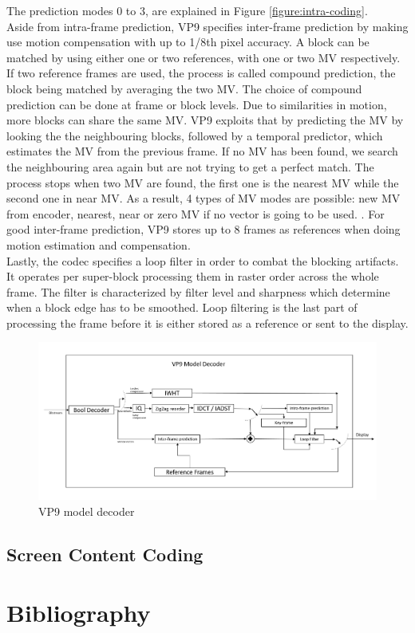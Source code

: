 \documentclass[a4paper,11pt,oneside]{article}
\begin{document}
The prediction modes 0 to 3, are explained in Figure \ref{figure:intra-coding}. \\
Aside from intra-frame prediction, VP9 specifies inter-frame prediction by making use motion compensation with up to 1/8th pixel accuracy. A block can be matched by using either one or two references, with one or two MV respectively. If two reference frames are used, the process is called compound prediction, the block being matched by averaging the two MV. The choice of compound prediction can be done at frame or block levels. Due to similarities in motion, more blocks can share the same MV. VP9 exploits that by predicting the MV by looking the the neighbouring blocks, followed by a temporal predictor, which estimates the MV from the previous frame. If no MV has been found, we search the neighbouring area again but are not trying to get a perfect match. The process stops when two MV are found, the first one is the nearest MV while the second one in near MV. As a result, 4 types of MV modes are possible: new MV from encoder, nearest, near or zero MV if no vector is going to be used. \cite[pp.~20]{vp9_bitstream}. For good inter-frame prediction, VP9 stores up to 8 frames as references when doing motion estimation and compensation. \\
\indent Lastly, the codec specifies a loop filter in order to combat the blocking artifacts. It operates per super-block processing them in raster order across the whole frame. The filter is characterized by filter level and sharpness  which determine when a block edge has to be smoothed. Loop filtering is the last part of processing the frame before it is either stored as a reference or sent to the display.\\

\begin{figure}[h]
  \centering
  \includegraphics[width=\textwidth]{../figures/vp9_decoder(1).pdf}
  \caption{VP9 model decoder}
  \label{figure:vp9_decoder}
\end{figure} 
\clearpage
\subsection{Screen Content Coding}






\newpage
\section*{Bibliography}
\printbibliography
\end{document}
